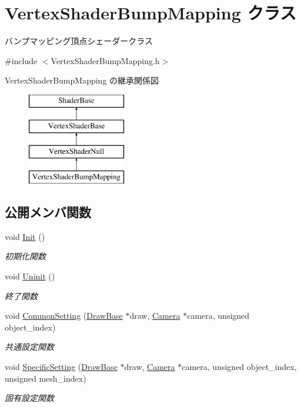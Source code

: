 \hypertarget{class_vertex_shader_bump_mapping}{}\section{Vertex\+Shader\+Bump\+Mapping クラス}
\label{class_vertex_shader_bump_mapping}


バンプマッピング頂点シェーダークラス  




{\ttfamily \#include $<$Vertex\+Shader\+Bump\+Mapping.\+h$>$}

Vertex\+Shader\+Bump\+Mapping の継承関係図\begin{figure}[H]
\begin{center}
\leavevmode
\includegraphics[height=4.000000cm]{class_vertex_shader_bump_mapping}
\end{center}
\end{figure}
\subsection*{公開メンバ関数}
\begin{DoxyCompactItemize}
\item 
void \mbox{\hyperlink{class_vertex_shader_bump_mapping_a6c0f59d1f29fd883943a66bfe61b6b03}{Init}} ()
\begin{DoxyCompactList}\small\item\em 初期化関数 \end{DoxyCompactList}\item 
void \mbox{\hyperlink{class_vertex_shader_bump_mapping_abed4e0aa9655fa7a7a21e03d00e7c0e5}{Uninit}} ()
\begin{DoxyCompactList}\small\item\em 終了関数 \end{DoxyCompactList}\item 
void \mbox{\hyperlink{class_vertex_shader_bump_mapping_a7979584d035fff86d386c99617a8dd2c}{Common\+Setting}} (\mbox{\hyperlink{class_draw_base}{Draw\+Base}} $\ast$draw, \mbox{\hyperlink{class_camera}{Camera}} $\ast$camera, unsigned object\+\_\+index)
\begin{DoxyCompactList}\small\item\em 共通設定関数 \end{DoxyCompactList}\item 
void \mbox{\hyperlink{class_vertex_shader_bump_mapping_ad81d57336763441c4071f967b57dbce1}{Specific\+Setting}} (\mbox{\hyperlink{class_draw_base}{Draw\+Base}} $\ast$draw, \mbox{\hyperlink{class_camera}{Camera}} $\ast$camera, unsigned object\+\_\+index, unsigned mesh\+\_\+index)
\begin{DoxyCompactList}\small\item\em 固有設定関数 \end{DoxyCompactList}\end{DoxyCompactItemize}

